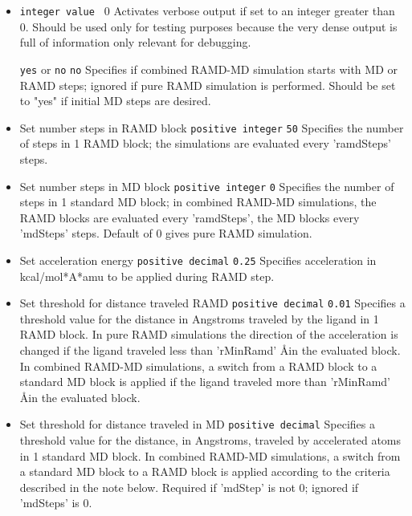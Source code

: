 \begin{itemize}

\item
{} {\tt integer value } {0} { Activates verbose output if set to an integer greater than 0. Should be used only for testing purposes because the very dense output is full of information only relevant for debugging.}

 {{\tt yes} or {\tt no}} {{\tt no}} { Specifies if combined RAMD-MD simulation starts with MD or RAMD steps; ignored if pure RAMD simulation is performed.  Should be set to "yes" if initial MD steps are desired.}

\item
{} { Set number steps in RAMD block} {{\tt positive integer}} {{\tt 50}} {Specifies the number of steps in 1 RAMD block; the simulations are evaluated every 'ramdSteps' steps.} 
 
\item
{} { Set number steps in MD block} {{\tt positive integer}} {{\tt 0}} {Specifies the number of steps in 1 standard MD block; in combined RAMD-MD simulations, the RAMD blocks are evaluated every 'ramdSteps', the MD blocks every 'mdSteps' steps. Default of 0 gives pure RAMD simulation.}

\item
{} {Set acceleration energy} {{\tt positive decimal}} {{\tt 0.25}} {Specifies acceleration in kcal/mol*A*amu to be applied during RAMD step.}

\item
{} {Set threshold for distance traveled RAMD} {{\tt positive decimal}} {{\tt 0.01}} {Specifies a threshold value for the distance in Angstroms traveled by the ligand in 1 RAMD block. In pure RAMD simulations the direction of the acceleration is changed if the ligand traveled less than 'rMinRamd' \AA in the evaluated block. In combined RAMD-MD simulations, a switch from a RAMD block to a standard MD block is applied if the ligand traveled more than 'rMinRamd' \AA in the evaluated block.}

\item
{} {Set threshold for distance traveled in MD} {{\tt positive decimal}} {Specifies a threshold value for the distance, in Angstroms, traveled by accelerated atoms in 1 standard MD block.  In combined RAMD-MD simulations, a switch from a standard MD block to a RAMD block is applied according to the criteria described in the note below.  Required if 'mdStep' is not 0; ignored if 'mdSteps' is 0.}
 

\end{itemize}
